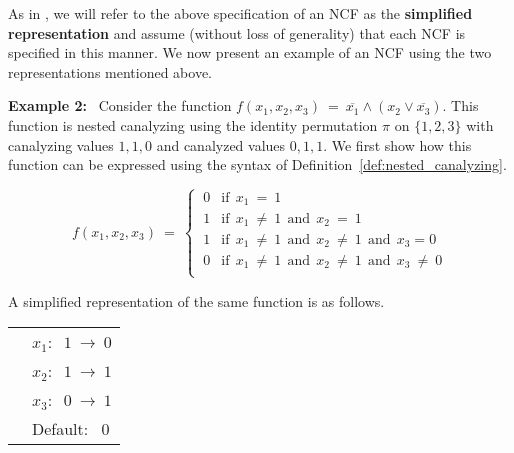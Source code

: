 \medskip
\noindent
As in \cite{Stearns-etal-2018}, we will refer to the above specification
of an NCF as the \textbf{simplified representation} and assume
(without loss of generality) that each NCF is specified in this manner.
We now present an example of an NCF using the two representations
mentioned above.


\medskip
\noindent
\textbf{Example 2:}~ Consider the function 
$f(x_1, x_2, x_3) ~=~ \overline{x_1} \wedge (x_2 \vee \overline{x_3})$.
This function is nested canalyzing using the identity permutation $\pi$ on $\{1,2,3\}$
with canalyzing values $1,1,0$ and canalyzed values $0, 1, 1$.
We first show how this function can be expressed using the syntax of
Definition~\ref{def:nested_canalyzing}.

\[
f(x_1, x_2, x_3) ~=~ 
   \begin{cases}
       \:0 & \mathrm{if~~} x_{1} ~=~ 1 \\
       \:1 & \mathrm{if~~} x_{1} ~\neq~ 1 \mathrm{~~and~~}
            x_{2} ~=~ 1 \\
       \:1 & \mathrm{if~~} x_{1} ~\neq~ 1 \mathrm{~~and~~}
            x_{2} ~\neq~ 1 \mathrm{~~and~~} x_{3} = 0 \\
       \:0 & \mathrm{if~~} x_{1} ~\neq~ 1 \mathrm{~~and~~}
            x_{2} ~\neq~ 1 \mathrm{~~and~~} x_{3} ~\neq~ 0 \\
   \end{cases}
\]

\medskip
\noindent
A simplified representation of the same function is as follows.

\bigskip

\noindent
\begin{tabular}{ll}
\hspace*{1.1in} & $x_1:~$  $1 ~\longrightarrow~ 0$ \\ [1ex]
\hspace*{1.1in} & $x_2:~$  $1 ~\longrightarrow~ 1$ \\ [1ex]
\hspace*{1.1in} & $x_3:~$  $0 ~\longrightarrow~ 1$ \\ [1ex]
\hspace*{1.1in} & Default:~ $0$ \\
\end{tabular}

